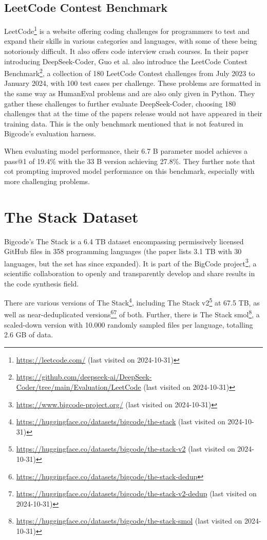 \subsection{LeetCode Contest Benchmark}
\label{sec:leetcode}
LeetCode\footnote{\url{https://leetcode.com/} (last visited on 2024-10-31)} is a website offering coding challenges for programmers to test and expand their skills in various categories and languages, with some of these being notoriously difficult.
It also offers code interview crash courses.
In their paper introducing DeepSeek-Coder, Guo et al. \cite{Guo.2024} also introduce the LeetCode Contest Benchmark\footnote{\url{https://github.com/deepseek-ai/DeepSeek-Coder/tree/main/Evaluation/LeetCode} (last visited on 2024-10-31)}, a collection of 180 LeetCode Contest challenges from July 2023 to January 2024, with 100 test cases per challenge.
These problems are formatted in the same way as HumanEval problems and are also only given in Python.
They gather these challenges to further evaluate DeepSeek-Coder, choosing 180 challenges that at the time of the papers release would not have appeared in their training data.
This is the only benchmark mentioned that is not featured in Bigcode's evaluation harness.

When evaluating model performance, their 6.7 B parameter model achieves a pass@1 of 19.4\% with the 33 B version achieving 27.8\%.
They further note that \ac{cot} prompting improved model performance on this benchmark, especially with more challenging problems.

\section{The Stack Dataset}
\label{sec:thestack}

Bigcode's The Stack \cite{Kocetkov.2023} is a 6.4 TB dataset encompassing permissively licensed GitHub files in 358 programming languages (the paper lists 3.1 TB with 30 languages, but the set has since expanded).
It is part of the BigCode project\footnote{\url{https://www.bigcode-project.org/} (last visited on 2024-10-31)}, a scientific collaboration to openly and transparently develop and share results in the code synthesis field.

There are various versions of The Stack\footnote{\url{https://huggingface.co/datasets/bigcode/the-stack} (last visited on 2024-10-31)}, including The Stack v2\footnote{\url{https://huggingface.co/datasets/bigcode/the-stack-v2} (last visited on 2024-10-31)} at 67.5 TB, as well as near-deduplicated versions\footnote{\url{https://huggingface.co/datasets/bigcode/the-stack-dedup}}\footnote{\url{https://huggingface.co/datasets/bigcode/the-stack-v2-dedup} (last visited on 2024-10-31)} of both.
Further, there is The Stack smol\footnote{\url{https://huggingface.co/datasets/bigcode/the-stack-smol} (last visited on 2024-10-31)}, a scaled-down version with 10.000 randomly sampled files per language, totalling 2.6 GB of data.

